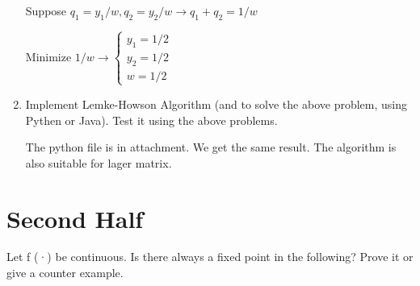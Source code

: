 \documentclass{article}
\newenvironment{answer}{\par\color{ForestGreen}}{\par}
\begin{document}
\begin{enumerate}
\begin{answer}
      Suppose $q_1 = y_1/w, q_2 = y_2 /w \rightarrow q_1 + q_2 = 1/w$

      Minimize $1/w \rightarrow
      \begin{cases}
        y_1 = 1/2 \\
        y_2 = 1/2 \\
        w = 1/2
     \end{cases}
      $

    \end{answer}

    \item
    Implement Lemke-Howson Algorithm (and to solve the above problem, using Pythen or Java). Test it using the above problems.

    \begin{answer}
      The python file is in attachment. We get the same result. The algorithm is also suitable for lager matrix. 
    \end{answer}

\end{enumerate}

\section{Second Half}
Let f (·) be continuous. Is there always a fixed point in the following? Prove it or give a counter example.
\end{document}
